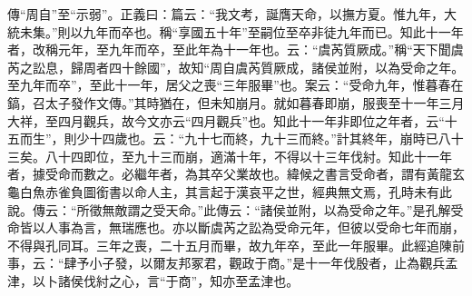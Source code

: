 {\noindent\zhuan{}\fzbyks 傳“周自”至“示弱”。正義曰：篇云：“我文考，誕膺天命，以撫方夏。惟九年，大統未集。”則以九年而卒也。稱“享國五十年”至嗣位至卒非徒九年而已。知此十一年者，改稱元年，至九年而卒，至此年為十一年也。云：“虞芮質厥成。”稱“天下聞虞芮之訟息，歸周者四十餘國”，故知“周自虞芮質厥成，諸侯並附，以為受命之年。至九年而卒”，至此十一年，居父之喪“三年服畢”也。案云：“受命九年，惟暮春在鎬，召太子發作文傳。”其時猶在，但未知崩月。就如暮春即崩，服喪至十一年三月大祥，至四月觀兵，故今文亦云“四月觀兵”也。知此十一年非即位之年者，云“十五而生”，則少十四歲也。云：“九十七而終，九十三而終。”計其終年，崩時已八十三矣。八十四即位，至九十三而崩，適滿十年，不得以十三年伐紂。知此十一年者，據受命而數之。必繼年者，為其卒父業故也。緯候之書言受命者，謂有黃龍玄龜白魚赤雀負圖銜書以命人主，其言起于漢哀平之世，經典無文焉，孔時未有此說。傳云：“所徵無敵謂之受天命。”此傳云：“諸侯並附，以為受命之年。”是孔解受命皆以人事為言，無瑞應也。亦以斷虞芮之訟為受命元年，但彼以受命七年而崩，不得與孔同耳。三年之喪，二十五月而畢，故九年卒，至此一年服畢。此經追陳前事，云：“肆予小子發，以爾友邦冢君，觀政于商。”是十一年伐殷者，止為觀兵孟津，以卜諸侯伐紂之心，言“于商”，知亦至孟津也。 \par}


